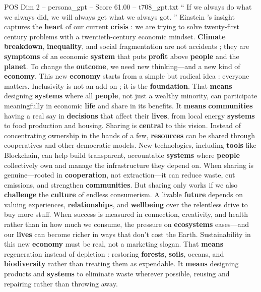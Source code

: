 \begin{textsample}{POS Dim 2 – persona\_gpt – Score 61.00 – t708\_gpt.txt}  \label{ex:f2_pos_009}
“ If we always do what we always did, we will always get what we always got. ” Einstein ’s insight captures the \textbf{heart} of our current \textbf{crisis} : we are trying to solve twenty-first century problems with a twentieth-century economic mindset. \textbf{Climate} \textbf{breakdown}, \textbf{inequality}, and social fragmentation are not accidents ; they are \textbf{symptoms} of an economic \textbf{system} that puts \textbf{profit} above \textbf{people} and the \textbf{planet}.
To change the \textbf{outcome}, we need new thinking—and a new kind of \textbf{economy}.
This new \textbf{economy} starts from a simple but radical idea : everyone matters.
Inclusivity is not an add-on ; it is the \textbf{foundation}.
That \textbf{means} designing \textbf{systems} where all \textbf{people}, not just a wealthy minority, can participate meaningfully in economic \textbf{life} and share in its benefits.
It \textbf{means} \textbf{communities} having a real say in \textbf{decisions} that affect their \textbf{lives}, from local energy \textbf{systems} to food production and housing.
Sharing is \textbf{central} to this vision.
Instead of concentrating ownership in the hands of a few, \textbf{resources} can be shared through cooperatives and other democratic models.
New technologies, including \textbf{tools} like Blockchain, can help build transparent, accountable \textbf{systems} where \textbf{people} collectively own and manage the infrastructure they depend on.
When sharing is genuine—rooted in \textbf{cooperation}, not extraction—it can reduce waste, cut emissions, and strengthen \textbf{communities}.
But sharing only works if we also \textbf{challenge} the \textbf{culture} of endless consumerism.
A livable \textbf{future} depends on valuing experiences, \textbf{relationships}, and \textbf{wellbeing} over the relentless drive to buy more stuff.
When success is measured in connection, creativity, and health rather than in how much we consume, the pressure on \textbf{ecosystems} eases—and our \textbf{lives} can become richer in ways that don't cost the Earth.
Sustainability in this new \textbf{economy} must be real, not a marketing slogan.
That \textbf{means} regeneration instead of depletion : restoring \textbf{forests}, \textbf{soils}, oceans, and \textbf{biodiversity} rather than treating them as expendable.
It \textbf{means} designing products and \textbf{systems} to eliminate waste wherever possible, reusing and repairing rather than throwing away.

\end{textsample}
